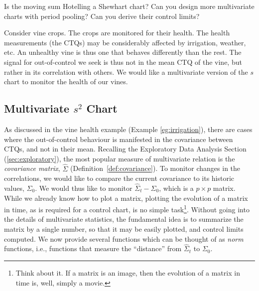 \begin{think}
	Is the moving sum Hotelling a Shewhart chart? 
	Can you design more multivariate charts with period pooling? 
	Can you derive their control limits?
\end{think}









\begin{example}
\label{eg:irrigation}
Consider vine crops.
The crops are monitored for their health.
The health measurements (the CTQs) may be considerably affected by irrigation, weather, etc.
An unhealthy vine is thus one that behaves differently than the rest. 
The signal for out-of-control we seek is thus not in the mean CTQ of the vine, but rather in its correlation with others. 
We would like a multivariate version of the $s$ chart to monitor the health of our vines.  
\end{example}




\subsection[Multivariate s chart]{Multivariate $s^2$ Chart}
\label{sec:multivarite_s}

As discussed in the vine health example (Example \ref{eg:irrigation}), there are cases where the out-of-control behaviour is manifested in the covariance between CTQs, and not in their mean.
Recalling the Exploratory Data Analysis Section (\ref{sec:exploratory}), the most popular measure of multivariate relation is the \emph{covariance matrix}, $\hat{\Sigma}$ (Definition~\ref{def:covariance}).
To monitor changes in the correlations, we would like to compare the current covariance to its historic values, $\Sigma_0$. 
We would thus like to monitor $\hat{\Sigma}_t-\Sigma_0$, which is a $p\times p$ matrix. 
While we already know how to plot a matrix, plotting the evolution of a matrix in time, as is required for a control chart, is no simple task\footnote{Think about it. If a matrix is an image, then the evolution of a matrix in time is, well, simply a movie.}. 
Without going into the details of multivariate statistics, the fundamental idea is to summarize the matrix by a single number, so that it may be easily plotted, and control limits computed. 
We now provide several functions which can be thought of as \emph{norm} functions, i.e., functions that measure the ``distance'' from $\hat{\Sigma}_t$ to $\Sigma_0$. 




